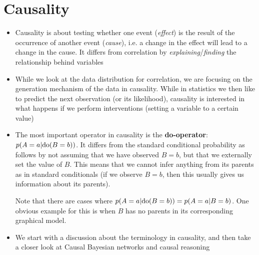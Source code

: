 \section{Causality}
\begin{itemize}
	\item Causality is about testing whether one event (\textit{effect}) is the result of the occurrence of another event (\textit{cause}), i.e. a change in the effect will lead to a change in the cause. It differs from correlation by \textit{explaining}/\textit{finding} the relationship behind variables
	\item While we look at the data distribution for correlation, we are focusing on the generation mechanism of the data in causality. While in statistics we then like to predict the next observation (or its likelihood), causality is interested in what happens if we perform interventions (setting a variable to a certain value)
	\item The most important operator in causality is the \textbf{do-operator}: $p(A=a|\textnormal{do}(B=b))$. It differs from the standard conditional probability as follows by not assuming that we have observed $B=b$, but that we externally set the value of $B$. This means that we cannot infer anything from its parents as in standard conditionals (if we observe $B=b$, then this usually gives us information about its parents).
	
	Note that there are cases where $p(A=a|\textnormal{do}(B=b))=p(A=a|B=b)$. One obvious example for this is when $B$ has no parents in its corresponding graphical model.
	\item We start with a discussion about the terminology in causality, and then take a closer look at Causal Bayesian networks and causal reasoning
\end{itemize}
